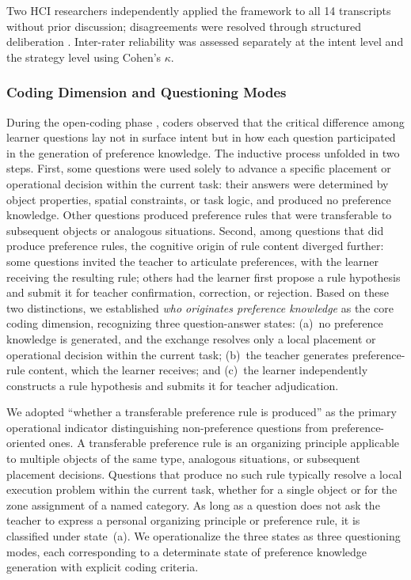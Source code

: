 \documentclass[manuscript,review,anonymous]{acmart}
\begin{document}
Two HCI researchers independently applied the framework to all 14 transcripts without prior discussion; disagreements were resolved through structured deliberation \citep{saldana2021coding}. Inter-rater reliability was assessed separately at the intent level and the strategy level using Cohen's $\kappa$.

\subsubsection{Coding Dimension and Questioning Modes}
\label{sec:coding-dimension}

During the open-coding phase \citep{saldana2021coding}, coders observed that the critical difference among learner questions lay not in surface intent but in how each question participated in the generation of preference knowledge. The inductive process unfolded in two steps. First, some questions were used solely to advance a specific placement or operational decision within the current task: their answers were determined by object properties, spatial constraints, or task logic, and produced no preference knowledge. Other questions produced preference rules that were transferable to subsequent objects or analogous situations. Second, among questions that did produce preference rules, the cognitive origin of rule content diverged further: some questions invited the teacher to articulate preferences, with the learner receiving the resulting rule; others had the learner first propose a rule hypothesis and submit it for teacher confirmation, correction, or rejection. Based on these two distinctions, we established \textit{who originates preference knowledge} as the core coding dimension, recognizing three question-answer states: (a)~no preference knowledge is generated, and the exchange resolves only a local placement or operational decision within the current task; (b)~the teacher generates preference-rule content, which the learner receives; and (c)~the learner independently constructs a rule hypothesis and submits it for teacher adjudication.

We adopted ``whether a transferable preference rule is produced'' as the primary operational indicator distinguishing non-preference questions from preference-oriented ones. A transferable preference rule is an organizing principle applicable to multiple objects of the same type, analogous situations, or subsequent placement decisions. Questions that produce no such rule typically resolve a local execution problem within the current task, whether for a single object or for the zone assignment of a named category. As long as a question does not ask the teacher to express a personal organizing principle or preference rule, it is classified under state~(a). We operationalize the three states as three questioning modes, each corresponding to a determinate state of preference knowledge generation with explicit coding criteria.
\end{document}
